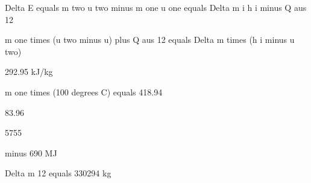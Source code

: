 Delta E equals m two u two minus m one u one equals Delta m i h i minus Q aus 12

m one times (u two minus u) plus Q aus 12 equals Delta m times (h i minus u two)

292.95 kJ/kg

m one times (100 degrees C) equals 418.94

83.96

5755

minus 690 MJ

Delta m 12 equals 330294 kg
